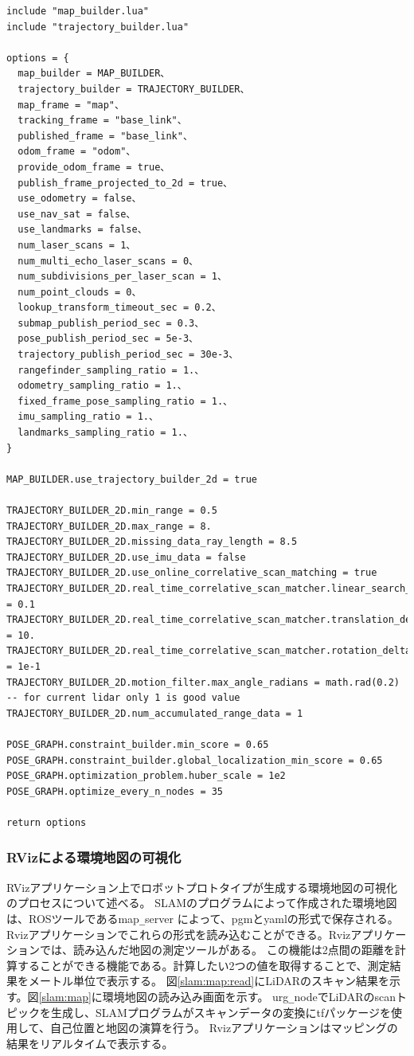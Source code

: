 \begin{lrbox}{\mybox}
\begin{lstlisting}[caption=Cartographerの座標系とレーザオドメトリのパラメータの設定,label=slam:s5]
include "map_builder.lua"
include "trajectory_builder.lua"

options = {
  map_builder = MAP_BUILDER、
  trajectory_builder = TRAJECTORY_BUILDER、
  map_frame = "map"、
  tracking_frame = "base_link"、
  published_frame = "base_link"、
  odom_frame = "odom"、
  provide_odom_frame = true、
  publish_frame_projected_to_2d = true、
  use_odometry = false、
  use_nav_sat = false、
  use_landmarks = false、
  num_laser_scans = 1、
  num_multi_echo_laser_scans = 0、
  num_subdivisions_per_laser_scan = 1、
  num_point_clouds = 0、
  lookup_transform_timeout_sec = 0.2、
  submap_publish_period_sec = 0.3、
  pose_publish_period_sec = 5e-3、
  trajectory_publish_period_sec = 30e-3、
  rangefinder_sampling_ratio = 1.、
  odometry_sampling_ratio = 1.、
  fixed_frame_pose_sampling_ratio = 1.、
  imu_sampling_ratio = 1.、
  landmarks_sampling_ratio = 1.、
}

MAP_BUILDER.use_trajectory_builder_2d = true

TRAJECTORY_BUILDER_2D.min_range = 0.5
TRAJECTORY_BUILDER_2D.max_range = 8.
TRAJECTORY_BUILDER_2D.missing_data_ray_length = 8.5
TRAJECTORY_BUILDER_2D.use_imu_data = false
TRAJECTORY_BUILDER_2D.use_online_correlative_scan_matching = true
TRAJECTORY_BUILDER_2D.real_time_correlative_scan_matcher.linear_search_window = 0.1
TRAJECTORY_BUILDER_2D.real_time_correlative_scan_matcher.translation_delta_cost_weight = 10.
TRAJECTORY_BUILDER_2D.real_time_correlative_scan_matcher.rotation_delta_cost_weight = 1e-1
TRAJECTORY_BUILDER_2D.motion_filter.max_angle_radians = math.rad(0.2)
-- for current lidar only 1 is good value
TRAJECTORY_BUILDER_2D.num_accumulated_range_data = 1

POSE_GRAPH.constraint_builder.min_score = 0.65
POSE_GRAPH.constraint_builder.global_localization_min_score = 0.65
POSE_GRAPH.optimization_problem.huber_scale = 1e2
POSE_GRAPH.optimize_every_n_nodes = 35

return options  
\end{lstlisting}
\end{lrbox}
\scalebox{.9}{\usebox{\mybox}}

\subsubsection{RVizによる環境地図の可視化}
RVizアプリケーション上でロボットプロトタイプが生成する環境地図の可視化のプロセスについて述べる。
SLAMのプログラムによって作成された環境地図は、ROSツールであるmap\verb|_|server によって、pgmとyamlの形式で保存される。
Rvizアプリケーションでこれらの形式を読み込むことができる。Rvizアプリケーションでは、読み込んだ地図の測定ツールがある。
この機能は2点間の距離を計算することができる機能である。計算したい2つの値を取得することで、測定結果をメートル単位で表示する。
図\ref{slam:map:read}にLiDARのスキャン結果を示す。図\ref{slam:map}に環境地図の読み込み画面を示す。
urg\verb|_|nodeでLiDARのscanトピックを生成し、SLAMプログラムがスキャンデータの変換にtfパッケージを使用して、自己位置と地図の演算を行う。
Rvizアプリケーションはマッピングの結果をリアルタイムで表示する。

